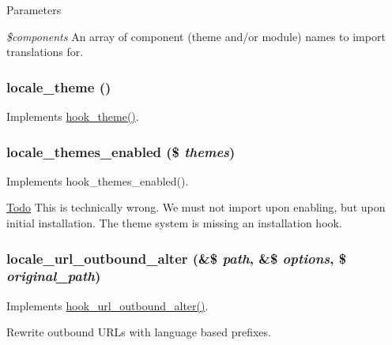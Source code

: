 \begin{DoxyParams}{Parameters}
\item[{\em \$components}]An array of component (theme and/or module) names to import translations for. \end{DoxyParams}
\hypertarget{locale_8module_ac254e72900f872d8999dd7dcea4624bd}{
\subsubsection[{locale\_\-theme}]{\setlength{\rightskip}{0pt plus 5cm}locale\_\-theme ()}}
\label{locale_8module_ac254e72900f872d8999dd7dcea4624bd}
Implements \hyperlink{group__hooks_ga013ccb45c7aaab1c16cf9691428c910d}{hook\_\-theme()}. \hypertarget{locale_8module_a0378f720a467d804640a979f956dd442}{
\subsubsection[{locale\_\-themes\_\-enabled}]{\setlength{\rightskip}{0pt plus 5cm}locale\_\-themes\_\-enabled (\$ {\em themes})}}
\label{locale_8module_a0378f720a467d804640a979f956dd442}
Implements hook\_\-themes\_\-enabled().

\begin{Desc}
\item[\hyperlink{todo__todo000016}{Todo}]This is technically wrong. We must not import upon enabling, but upon initial installation. The theme system is missing an installation hook. \end{Desc}
\hypertarget{locale_8module_aa085fd2fb014798616bc7efbbd94de1a}{
\subsubsection[{locale\_\-url\_\-outbound\_\-alter}]{\setlength{\rightskip}{0pt plus 5cm}locale\_\-url\_\-outbound\_\-alter (\&\$ {\em path}, \/  \&\$ {\em options}, \/  \$ {\em original\_\-path})}}
\label{locale_8module_aa085fd2fb014798616bc7efbbd94de1a}
Implements \hyperlink{group__hooks_gaae456dc4459a029bc099079814ded61f}{hook\_\-url\_\-outbound\_\-alter()}.

Rewrite outbound URLs with language based prefixes. 